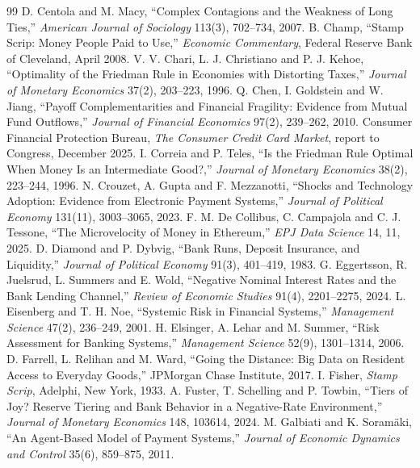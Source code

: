 \documentclass[10pt,a4paper]{article}
\theoremstyle{remark}
\begin{document}
\begin{thebibliography}{99}
 D. Centola and M. Macy, ``Complex Contagions and the Weakness of Long Ties,'' \emph{American Journal of Sociology} 113(3), 702--734, 2007.
 B. Champ, ``Stamp Scrip: Money People Paid to Use,'' \emph{Economic Commentary}, Federal Reserve Bank of Cleveland, April 2008.
 V. V. Chari, L. J. Christiano and P. J. Kehoe, ``Optimality of the Friedman Rule in Economies with Distorting Taxes,'' \emph{Journal of Monetary Economics} 37(2), 203--223, 1996.
 Q. Chen, I. Goldstein and W. Jiang, ``Payoff Complementarities and Financial Fragility: Evidence from Mutual Fund Outflows,'' \emph{Journal of Financial Economics} 97(2), 239--262, 2010.
 Consumer Financial Protection Bureau, \emph{The Consumer Credit Card Market}, report to Congress, December 2025.
 I. Correia and P. Teles, ``Is the Friedman Rule Optimal When Money Is an Intermediate Good?,'' \emph{Journal of Monetary Economics} 38(2), 223--244, 1996.
 N. Crouzet, A. Gupta and F. Mezzanotti, ``Shocks and Technology Adoption: Evidence from Electronic Payment Systems,'' \emph{Journal of Political Economy} 131(11), 3003--3065, 2023.
 F. M. De Collibus, C. Campajola and C. J. Tessone, ``The Microvelocity of Money in Ethereum,'' \emph{EPJ Data Science} 14, 11, 2025.
 D. Diamond and P. Dybvig, ``Bank Runs, Deposit Insurance, and Liquidity,'' \emph{Journal of Political Economy} 91(3), 401--419, 1983.
 G. Eggertsson, R. Juelsrud, L. Summers and E. Wold, ``Negative Nominal Interest Rates and the Bank Lending Channel,'' \emph{Review of Economic Studies} 91(4), 2201--2275, 2024.
 L. Eisenberg and T. H. Noe, ``Systemic Risk in Financial Systems,'' \emph{Management Science} 47(2), 236--249, 2001.
 H. Elsinger, A. Lehar and M. Summer, ``Risk Assessment for Banking Systems,'' \emph{Management Science} 52(9), 1301--1314, 2006.
 D. Farrell, L. Relihan and M. Ward, ``Going the Distance: Big Data on Resident Access to Everyday Goods,'' JPMorgan Chase Institute, 2017.
 I. Fisher, \emph{Stamp Scrip}, Adelphi, New York, 1933.
 A. Fuster, T. Schelling and P. Towbin, ``Tiers of Joy? Reserve Tiering and Bank Behavior in a Negative-Rate Environment,'' \emph{Journal of Monetary Economics} 148, 103614, 2024.
 M. Galbiati and K. Soram\"aki, ``An Agent-Based Model of Payment Systems,'' \emph{Journal of Economic Dynamics and Control} 35(6), 859--875, 2011.

\end{thebibliography}
\end{document}
